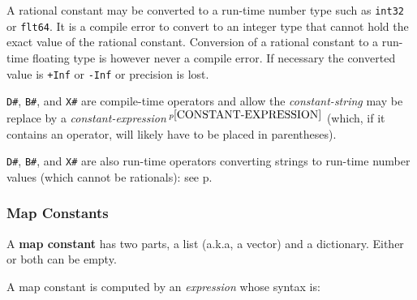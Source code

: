 \documentclass[12pt]{article}
\newcommand{\key}[1]{{\rm \bfseries #1}}
\newcommand{\pagref}[1]{p\pageref{#1}}
\newcommand{\pagnote}[1]{$\,^{p\pageref{#1}}$}
\begin{document}
A rational constant may be converted to a run-time number
type such as {\tt int32} or {\tt flt64}.
It is a compile error to convert to an integer type that cannot
hold the exact value of the rational constant.
Conversion of a rational constant
to a run-time floating type is however
never a compile error.  If necessary the converted value is
{\tt +Inf} or {\tt -Inf} or precision is lost.

{\tt D\#}, {\tt B\#}, and {\tt X\#} are compile-time operators and allow the
{\em constant-string} may be replace
by a {\em constant-expression}\pagnote{CONSTANT-EXPRESSION}
(which, if it contains an operator, will likely have to be
placed in parentheses).


{\tt D\#}, {\tt B\#}, and {\tt X\#} are also run-time operators
converting strings to run-time number values (which cannot be rationals):
see \pagref{RUN-TIME-STRING-TO-NUMBER-CONVERSIONS}.

\subsubsection{Map Constants}
\label{MAP-CONSTANTS}

A \key{map constant} has two parts, a list (a.k.a, a vector) and a dictionary.
Either or both can be empty.

A map constant is computed by an {\em expression} whose syntax is:
\end{document}

